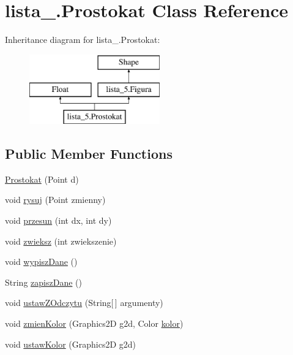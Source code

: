 \hypertarget{classlista__5_1_1_prostokat}{}\section{lista\+\_.\+Prostokat Class Reference}
\label{classlista__5_1_1_prostokat}
Inheritance diagram for lista\+\_.\+Prostokat\+:\begin{figure}[H]
\begin{center}
\leavevmode
\includegraphics[height=3.000000cm]{classlista__5_1_1_prostokat}
\end{center}
\end{figure}
\subsection*{Public Member Functions}
\begin{DoxyCompactItemize}
\item 
\mbox{\hyperlink{classlista__5_1_1_prostokat_acc8c546649b600148d733120799f0df6}{Prostokat}} (Point d)
\item 
void \mbox{\hyperlink{classlista__5_1_1_prostokat_a63b2bb7a2b3fd86e21d0d125f4262f39}{rysuj}} (Point zmienny)
\item 
void \mbox{\hyperlink{classlista__5_1_1_prostokat_a9e8a5112287441debbfe24165a24d322}{przesun}} (int dx, int dy)
\item 
void \mbox{\hyperlink{classlista__5_1_1_prostokat_acc961816d5fba86f3442ca34059492f5}{zwieksz}} (int zwiekszenie)
\item 
void \mbox{\hyperlink{classlista__5_1_1_prostokat_a95b9ce7b2a7b095c43ffc843cfeff39a}{wypisz\+Dane}} ()
\item 
String \mbox{\hyperlink{classlista__5_1_1_prostokat_a9537add38b8302420692068fb36726b5}{zapisz\+Dane}} ()
\item 
void \mbox{\hyperlink{classlista__5_1_1_prostokat_a93ae9f652ca00886c05be661b17a0886}{ustaw\+Z\+Odczytu}} (String\mbox{[}$\,$\mbox{]} argumenty)
\item 
void \mbox{\hyperlink{classlista__5_1_1_prostokat_aa776fbd55cc88f2bb8b8a202109e77ce}{zmien\+Kolor}} (Graphics2D g2d, Color \mbox{\hyperlink{classlista__5_1_1_prostokat_ad4564e93752646ac3267d2f559c25907}{kolor}})
\item 
void \mbox{\hyperlink{classlista__5_1_1_prostokat_ad63e4a8c7f291a54f8c9c285c8e6c8ff}{ustaw\+Kolor}} (Graphics2D g2d)
\end{DoxyCompactItemize}
